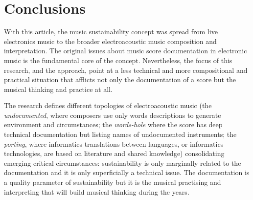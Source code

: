 \documentclass[twoside,a4paper]{article}
\begin{document}
%
%
%
%
%
%
%

\clearpage

\section{Conclusions}

With this article, the music sustainability concept was spread from live electronics music to the broader electroacoustic music composition and interpretation. The original issues \cite{bevi05} about music score documentation in electronic music is the fundamental core of the concept. Nevertheless, the focus of this research, and the approach, point at a less technical and more compositional and practical situation that afflicts not only the documentation of a score but the musical thinking and practice at all. 

The research defines different topologies of electroacoustic music (the \emph{undocumented}, where composers use only words descriptions to generate environment and circumstances; the \emph{words-hole} where the score has deep technical documentation but listing names of undocumented instruments; the \emph{porting}, where informatics translations between languages, or informatics technologies, are based on literature and shared knowledge) consolidating emerging critical circumstances: sustainability is only marginally related to the documentation and it is only superficially a technical issue. The documentation is a quality parameter of sustainability but it is the musical practising and interpreting that will build musical thinking during the years.
\end{document}
